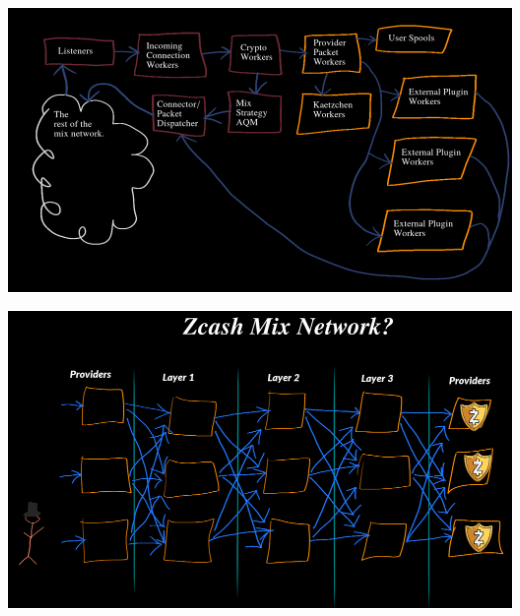 \documentclass[fleqn,xcolor={usenames,dvipsnames}]{beamer} %
\begin{document}
\begin{frame}
\begin{center}
\includegraphics[scale=.22]{pics/mix_aqm_pipeline2}
\end{center}
\end{frame}


\begin{frame}
\begin{center}
\includegraphics[scale=.24]{pics/zcash_mixnet}
\end{center}
\end{frame}
\end{document}
